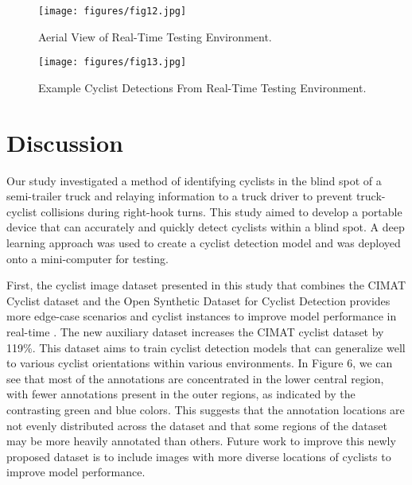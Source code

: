 \documentclass{article}
\begin{document}
\begin{figure}
\centering
\texttt{[image: figures/fig12.jpg]}
\caption{Aerial View of Real-Time Testing Environment.}
\label{fig:fig12}
\end{figure}

\begin{figure}
\centering
\texttt{[image: figures/fig13.jpg]}
\caption{Example Cyclist Detections From Real-Time Testing Environment. }
\label{fig:fig13}
\end{figure}

\section{Discussion}
Our study investigated a method of identifying cyclists in the blind spot of a semi-trailer truck and relaying information to a truck driver to prevent truck-cyclist collisions during right-hook turns. This study aimed to develop a portable device that can accurately and quickly detect cyclists within a blind spot. A deep learning approach was used to create a cyclist detection model and was deployed onto a mini-computer for testing. 

First, the cyclist image dataset presented in this study that combines the CIMAT Cyclist dataset and the Open Synthetic Dataset for Cyclist Detection provides more edge-case scenarios and cyclist instances to improve model performance in real-time \cite{garcia-venegas_safety_2021} \cite{thomas_open_2021}. The new auxiliary dataset increases the CIMAT cyclist dataset by 119\%. This dataset aims to train cyclist detection models that can generalize well to various cyclist orientations within various environments. In Figure 6, we can see that most of the annotations are concentrated in the lower central region, with fewer annotations present in the outer regions, as indicated by the contrasting green and blue colors. This suggests that the annotation locations are not evenly distributed across the dataset and that some regions of the dataset may be more heavily annotated than others. Future work to improve this newly proposed dataset is to include images with more diverse locations of cyclists to improve model performance.
\end{document}
